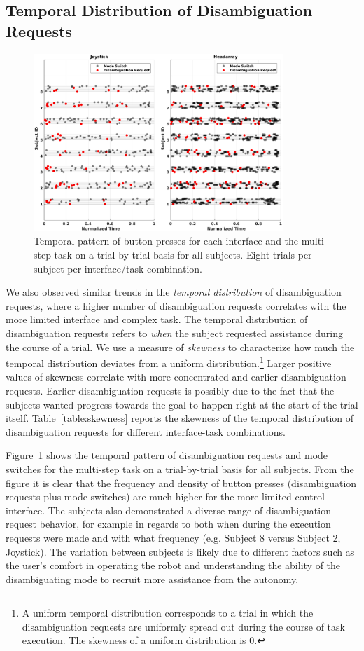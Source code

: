 \documentclass[natbib, twocolumn]{svjour3}          %
\begin{document}
\subsection{Temporal Distribution of Disambiguation Requests}
\begin{figure}[ht!]
	\centering
	\includegraphics[width = 0.84\textwidth,center]{Fig9.eps}
	\caption{Temporal pattern of button presses for each interface and the multi-step task on a trial-by-trial basis for all subjects. Eight trials per subject per interface/task combination.}
	\label{fig:ha_man_disamb}
\end{figure}
We also observed similar trends in the \textit{temporal distribution} of disambiguation requests, where a higher number of disambiguation requests correlates with the more limited interface and complex task. The temporal distribution of disambiguation requests refers to \textit{when} the subject requested assistance during the course of a trial. We use a measure of \textit{skewness} to characterize how much the temporal distribution deviates from a uniform distribution.\footnote{A uniform temporal distribution corresponds to a trial in which the disambiguation requests are uniformly spread out during the course of task execution. The skewness of a uniform distribution is $0$.} Larger positive values of skewness correlate with more concentrated and earlier disambiguation requests. Earlier disambiguation requests is possibly due to the fact that the subjects wanted progress towards the goal to happen right at the start of the trial itself. Table~\ref{table:skewness} reports the skewness of the temporal distribution of disambiguation requests for different interface-task combinations.


Figure~\ref{fig:ha_man_disamb} shows the temporal pattern of disambiguation requests and mode switches for the multi-step task on a trial-by-trial basis for all subjects. From the figure it is clear that the frequency and density of button presses (disambiguation requests plus mode switches) are much higher for the more limited control interface. The subjects also demonstrated a diverse range of disambiguation request behavior, for example in regards to both when during the execution requests were made and with what frequency (e.g. Subject 8 versus Subject 2, Joystick). The variation between subjects is likely due to different factors such as the user's comfort in operating the robot and understanding the ability of the disambiguating mode to recruit more assistance from the autonomy.
\end{document}
